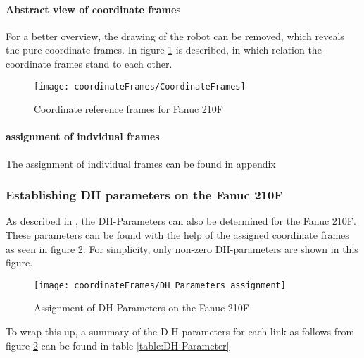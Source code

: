 \paragraph{Abstract view of coordinate frames}
For a better overview, the drawing of the robot can be removed, which reveals the pure coordinate frames. In figure \ref{fig:RefFrameAbstract} is described, in which relation the coordinate frames stand to each other.

\begin{figure}[H]
	\texttt{[image: coordinateFrames/CoordinateFrames]}
	\caption{Coordinate reference frames for Fanuc 210F}
	\label{fig:RefFrameAbstract}
\end{figure}

\paragraph{assignment of indvidual frames}
The assignment of individual frames can be found in appendix 





\subsubsection{Establishing \ac{DH} parameters on the Fanuc 210F}

As described in , the \ac{DH}-Parameters can also be determined for the Fanuc 210F.
These parameters can be found with the help of the assigned coordinate frames as seen in figure \ref{fig:DH_Parameters_Fanuc210F}. For simplicity, only non-zero DH-parameters are shown in this figure.

\begin{figure}[H]
	\texttt{[image: coordinateFrames/DH\_Parameters\_assignment]}
	\caption{Assignment of DH-Parameters on the Fanuc 210F}
	\label{fig:DH_Parameters_Fanuc210F}
\end{figure}


To wrap this up, a summary of the D-H parameters for each link as follows from figure \ref{fig:DH_Parameters_Fanuc210F} can be found in table \ref{table:DH-Parameter}



